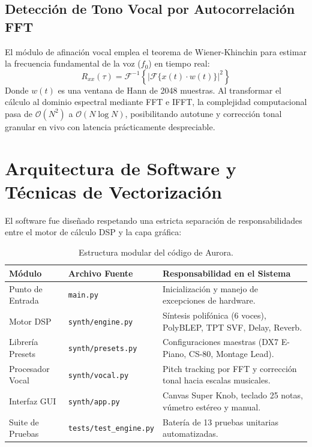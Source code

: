 \documentclass[11pt,a4paper]{article}
\begin{document}
\subsection{Detección de Tono Vocal por Autocorrelación FFT}
El módulo de afinación vocal emplea el teorema de Wiener-Khinchin para estimar la frecuencia fundamental de la voz ($f_0$) en tiempo real:
\begin{equation}
R_{xx}(\tau) = \mathcal{F}^{-1}\left\{ |\mathcal{F}\{x(t) \cdot w(t)\}|^2 \right\}
\end{equation}
Donde $w(t)$ es una ventana de Hann de 2048 muestras. Al transformar el cálculo al dominio espectral mediante FFT e IFFT, la complejidad computacional pasa de $\mathcal{O}(N^2)$ a $\mathcal{O}(N \log N)$, posibilitando autotune y corrección tonal granular en vivo con latencia prácticamente despreciable.

\section{Arquitectura de Software y Técnicas de Vectorización}

El software fue diseñado respetando una estricta separación de responsabilidades entre el motor de cálculo DSP y la capa gráfica:

\begin{table}[h]
\centering
\small
\begin{tabular}{@{}lll@{}}
\toprule
\textbf{Módulo} & \textbf{Archivo Fuente} & \textbf{Responsabilidad en el Sistema} \\ \midrule
Punto de Entrada & \texttt{main.py} & Inicialización y manejo de excepciones de hardware. \\
Motor DSP & \texttt{synth/engine.py} & Síntesis polifónica (6 voces), PolyBLEP, TPT SVF, Delay, Reverb. \\
Librería Presets & \texttt{synth/presets.py} & Configuraciones maestras (DX7 E-Piano, CS-80, Montage Lead). \\
Procesador Vocal & \texttt{synth/vocal.py} & Pitch tracking por FFT y corrección tonal hacia escalas musicales. \\
Interfaz GUI & \texttt{synth/app.py} & Canvas Super Knob, teclado 25 notas, vúmetro estéreo y manual. \\
Suite de Pruebas & \texttt{tests/test\_engine.py} & Batería de 13 pruebas unitarias automatizadas. \\ \bottomrule
\end{tabular}
\caption{Estructura modular del código de Aurora.}
\end{table}
\end{document}
